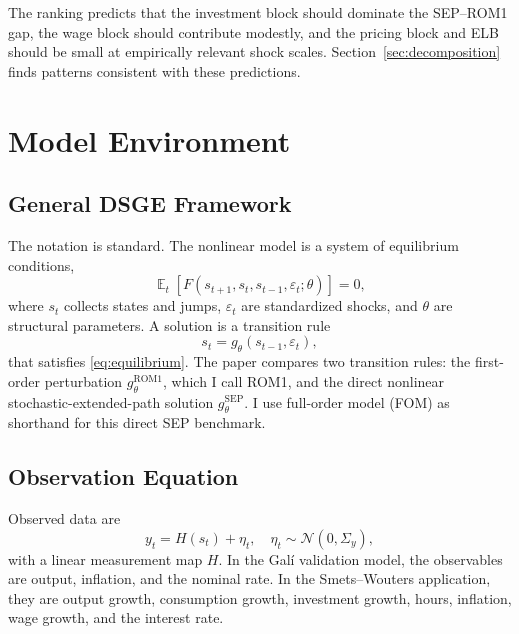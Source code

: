 \documentclass[12pt]{article}
\theoremstyle{plain}
\theoremstyle{definition}
\theoremstyle{remark}
\DeclareMathOperator{\E}{\mathbb{E}}
\newcommand{\eps}{\varepsilon}
\newcommand{\Sigmay}{\Sigma_y}
\begin{document}
The ranking predicts that the investment block should dominate the
SEP--ROM1 gap, the wage block should contribute modestly, and the pricing block
and ELB should be small at empirically relevant shock scales.
Section~\ref{sec:decomposition} finds patterns consistent with these
predictions.



\section{Model Environment}
\label{sec:model}

\subsection{General DSGE Framework}

The notation is standard. The nonlinear model is a system of equilibrium
conditions,
\begin{equation}
\label{eq:equilibrium}
\E_t\left[F(s_{t+1}, s_t, s_{t-1}, \eps_t; \theta)\right] = 0,
\end{equation}
where \(s_t\) collects states and jumps, \(\eps_t\) are standardized shocks,
and \(\theta\) are structural parameters. A solution is a transition rule
\begin{equation*}
s_t = g_\theta(s_{t-1}, \eps_t),
\end{equation*}
that satisfies \eqref{eq:equilibrium}. The paper compares two transition
rules: the first-order perturbation \(g_\theta^{\mathrm{ROM1}}\), which I call
ROM1, and the direct nonlinear stochastic-extended-path solution
\(g_\theta^{\mathrm{SEP}}\). I use full-order model (FOM) as shorthand for this
direct SEP benchmark.

\subsection{Observation Equation}

Observed data are
\begin{equation}
\label{eq:observation}
y_t = H(s_t) + \eta_t, \quad \eta_t \sim \mathcal{N}(0, \Sigmay),
\end{equation}
with a linear measurement map \(H\). In the Gal\'i validation model, the
observables are output, inflation, and the nominal rate. In the
Smets--Wouters application, they are output growth, consumption growth,
investment growth, hours, inflation, wage growth, and the interest rate.
\end{document}
